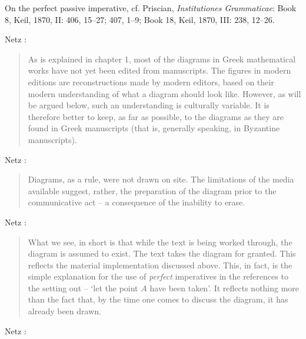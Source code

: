 \documentclass{article}
\begin{document}
On the perfect passive imperative, cf.
Priscian, {\em Institutiones Grammaticae}: Book 8, Keil, 1870, II: 406, 15--27; 407, 1--9;
Book 18, Keil, 1870, III: 238, 12--26.






Netz \cite[p.~xvii]{netz}:

\begin{quote}
As is explained in chapter 1, most of the diagrams in Greek mathematical
works have not yet been edited from manuscripts. The figures
in modern editions are reconstructions made by modern editors, based
on their modern understanding of what a diagram should look like.
However, as will be argued below, such an understanding is culturally
variable. It is therefore better to keep, as far as possible, to the diagrams
as they are found in Greek manuscripts (that is, generally
speaking, in Byzantine manuscripts).
\end{quote}

Netz \cite[p.~16]{netz}:

\begin{quote}
Diagrams, as a rule, were not drawn on site.
The limitations of the media available suggest, rather, the preparation
of the diagram prior to the communicative act -- a consequence of the
inability to erase.
\end{quote}

Netz \cite[p.~25]{netz}:

\begin{quote}
What we see, in short is that while the text is being worked through,
the diagram is assumed to exist. The text takes the diagram for granted.
This reflects the material implementation discussed above. This, in
fact, is the simple explanation for the use of {\em perfect} imperatives in the
references to the setting out -- `let the point $A$ have been taken'. It
reflects nothing more than the fact that, by the time one comes to
discuss the diagram, it has already been drawn.
\end{quote}

Netz \cite[pp.~94--95]{netz}:
\end{document}
